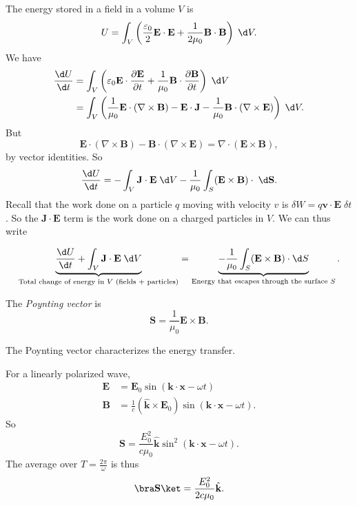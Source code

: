 \documentclass[a4paper]{article}
\begin{document}
The energy stored in a field in a volume $V$ is
\[
  U = \int_V \left(\frac{\varepsilon_0}{2}\mathbf{E}\cdot \mathbf{E} + \frac{1}{2\mu_0}\mathbf{B}\cdot \mathbf{B}\right)\;\d V.
\]
We have
\begin{align*}
  \frac{\d U}{\d t} &= \int_V \left(\varepsilon_0 \mathbf{E}\cdot \frac{\partial \mathbf{E}}{\partial t} + \frac{1}{\mu_0}\mathbf{B}\cdot \frac{\partial \mathbf{B}}{\partial t}\right)\;\d V\\
  &= \int_V \left(\frac{1}{\mu_0}\mathbf{E}\cdot (\nabla\times \mathbf{B}) - \mathbf{E}\cdot \mathbf{J} - \frac{1}{\mu_0}\mathbf{B}\cdot (\nabla\times \mathbf{E})\right)\;\d V.
\end{align*}
But
\[
  \mathbf{E}\cdot (\nabla \times \mathbf{B}) - \mathbf{B}\cdot (\nabla\times \mathbf{E}) = \nabla\cdot (\mathbf{E}\times \mathbf{B}),
\]
by vector identities. So
\[
  \frac{\d U}{\d t} = -\int_V \mathbf{J}\cdot \mathbf{E}\;\d V - \frac{1}{\mu_0}\int_S (\mathbf{E}\times \mathbf{B})\cdot \;\d \mathbf{S}.
\]
Recall that the work done on a particle $q$ moving with velocity $v$ is $\delta W = q\mathbf{v}\cdot \mathbf{E}\;\delta t$. So the $\mathbf{J}\cdot \mathbf{E}$ term is the work done on a charged particles in $V$. We can thus write
\begin{thm}
  \[
    \underbrace{\frac{\d U}{\d t} + \int_V \mathbf{J}\cdot \mathbf{E} \;\d V}_{\text{Total change of energy in $V$ (fields + particles)}} = \underbrace{-\frac{1}{\mu_0}\int_S (\mathbf{E}\times \mathbf{B})\cdot\d S}_{\text{Energy that escapes through the surface }S}.
  \]
\end{thm}

\begin{defi}
  The \emph{Poynting vector} is
  \[
    \mathbf{S} = \frac{1}{\mu_0}\mathbf{E}\times \mathbf{B}.
  \]
\end{defi}
The Poynting vector characterizes the energy transfer.

For a linearly polarized wave,
\begin{align*}
  \mathbf{E} &= \mathbf{E}_0 \sin (\mathbf{k}\cdot \mathbf{x} - \omega t)\\
  \mathbf{B} &= \frac{1}{c}(\hat{\mathbf{k}}\times \mathbf{E}_0)\sin (\mathbf{k}\cdot \mathbf{x} - \omega t).
\end{align*}
So
\[
  \mathbf{S} = \frac{E_0^2}{c\mu_0}\hat{\mathbf{k}} \sin^2(\mathbf{k}\cdot\mathbf{x} - \omega t).
\]
The average over $T = \frac{2\pi}{\omega}$ is thus
\[
  \bra\mathbf{S}\ket = \frac{E_0^2}{2c\mu_0}\hat{\mathbf{k}}.
\]
\end{document}
